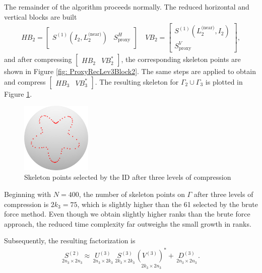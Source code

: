 \documentclass{sfuthesis}
\begin{document}
The remainder of the algorithm proceeds normally. The reduced horizontal and vertical blocks are built
\begin{align*}
	HB_2=\left[\begin{array}{cc}
	S^{(1)}(I_2, L_2^{\text{(near)}}) & S_{\text{proxy}}^H
	\end{array}\right] \quad VB_2=\left[\begin{array}{c}
	S^{(1)}(L_2^{\text{(near)}}, I_2) \\ S_{\text{proxy}}^V
\end{array}\right], 
\end{align*}
and after compressing $\left[\begin{array}{cc} HB_2 & VB_2^* \end{array} \right]$, the corresponding skeleton points are shown in Figure \ref{fig: ProxyRecLev3Block2}.
The same steps are applied to obtain and compress  $\left[\begin{array}{cc} HB_3 & VB_3^* \end{array} \right]$.
The resulting skeleton for $\Gamma_2 \cup \Gamma_3$ is plotted in Figure \ref{fig: ProxyRecLev3SkelAll}.
\begin{figure}[h]
	\centering
	\includegraphics[width=0.3\textwidth]{ProxyRecLev3SkelAll}
	\caption{Skeleton points selected by the ID after three levels of compression}
	\label{fig: ProxyRecLev3SkelAll}
\end{figure}
Beginning with $N=400$, the number of skeleton points on $\Gamma$ after three levels of compression is $2k_3=75$, which is slightly higher than the 61 selected by the brute force method. Even though we obtain slightly higher ranks than the brute force approach, the reduced time complexity far outweighs the small growth in ranks.

Subsequently, the resulting factorization is 
\begin{align*}
	\underset{2n_3 \times 2n_3}{S^{(2)}} \approx \underset{ \ 2n_3 \times 2k_3 \ } {U^{(3)}}\underset{ \ 2k_3 \times 2k_3 \ }{S^{(3)}} \underset{\ 2k_3 \times 2n_3 \ }{{(V^{(3)})}^*}+\underset{ \ 2n_3 \times 2n_3 \ }{D^{(3)}}.
\end{align*}
\end{document}
